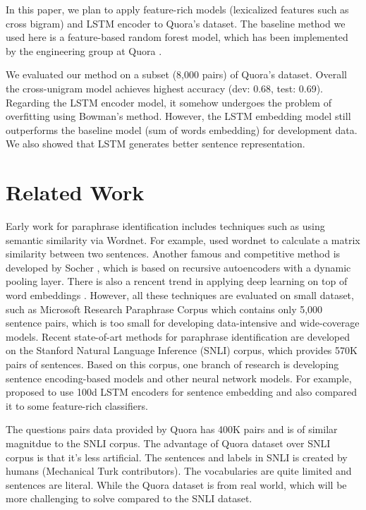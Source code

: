 \documentclass[11pt,a4paper]{article}
\begin{document}
In this paper, we plan to apply feature-rich models (lexicalized features such as cross bigram) and LSTM encoder \cite{bowman2015large} to Quora's dataset. The baseline method we used here is a feature-based random forest model, which has been implemented by the engineering group at Quora \cite{nikhil2017quora}.

We evaluated our method on a subset (8,000 pairs) of Quora's dataset. Overall the cross-unigram model achieves highest accuracy (dev: 0.68, test: 0.69). Regarding the LSTM encoder model, it somehow undergoes the problem of overfitting using Bowman's method. However, the LSTM embedding model still outperforms the baseline model (sum of words embedding) for development data. We also showed that LSTM generates better sentence representation.

\section{Related Work}
Early work for paraphrase identification includes techniques such as using semantic similarity via Wordnet. For example, \cite{fernando2008semantic} used wordnet to calculate a matrix similarity between two sentences. Another famous and competitive method is developed by Socher \cite{socher2011dynamic}, which is based on recursive autoencoders with a dynamic pooling layer. There is also a rencent trend in applying deep learning on top of word embeddings \cite{bogdanova2015detecting}. However, all these techniques are evaluated on small dataset, such as Microsoft Research Paraphrase Corpus which contains only 5,000 sentence pairs, which is too small for developing data-intensive and wide-coverage models\cite{bowman2015large}. Recent state-of-art methods for paraphrase identification are developed on the Stanford Natural Language Inference (SNLI) corpus, which provides 570K pairs of sentences. Based on this corpus, one branch of research is developing sentence encoding-based models and other neural network models. For example, \cite{bowman2015large} proposed to use 100d LSTM encoders for sentence embedding and also compared it to some feature-rich classifiers.

The questions pairs data provided by Quora has 400K pairs and is of similar magnitdue to the SNLI corpus. The advantage of Quora dataset over SNLI corpus is that it's less artificial. The sentences and labels in SNLI is created by humans (Mechanical Turk contributors). The vocabularies are quite limited and sentences are literal\cite{matthew2017quora}. While the Quora dataset is from real world, which will be more challenging to solve compared to the SNLI dataset.  
\end{document}
